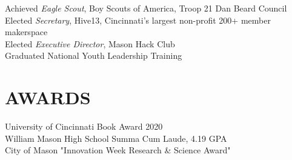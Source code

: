 \documentclass[margin]{res} %
\begin{document}
\begin{resume}
Achieved {\it Eagle Scout}, Boy Scouts of America, Troop 21 Dan Beard Council \\
Elected {\it Secretary}, Hive13, Cincinnati's largest non-profit 200+ member	 makerspace \\
Elected {\it Executive Director}, Mason Hack Club \\
Graduated National Youth Leadership Training \\

\vspace*{-4.5 mm}
\section{AWARDS}

University of Cincinnati Book Award 2020 \\
William Mason High School Summa Cum Laude, 4.19 GPA \\
City of Mason "Innovation Week Research \& Science Award"


\end{resume}
\end{document}
